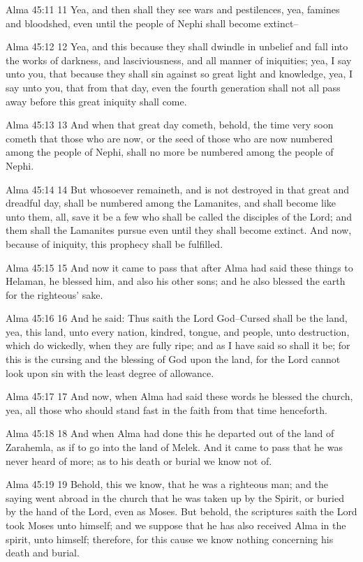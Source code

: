 Alma 45:11
 11 Yea, and then shall they see wars and pestilences, yea,
famines and bloodshed, even until the people of Nephi shall
become extinct--

Alma 45:12
 12 Yea, and this because they shall dwindle in unbelief and fall
into the works of darkness, and lasciviousness, and all manner of
iniquities; yea, I say unto you, that because they shall sin
against so great light and knowledge, yea, I say unto you, that
from that day, even the fourth generation shall not all pass away
before this great iniquity shall come.

Alma 45:13
 13 And when that great day cometh, behold, the time very soon
cometh that those who are now, or the seed of those who are now
numbered among the people of Nephi, shall no more be numbered
among the people of Nephi.

Alma 45:14
 14 But whosoever remaineth, and is not destroyed in that great
and dreadful day, shall be numbered among the Lamanites, and
shall become like unto them, all, save it be a few who shall be
called the disciples of the Lord; and them shall the Lamanites
pursue even until they shall become extinct. And now, because of
iniquity, this prophecy shall be fulfilled.

Alma 45:15
 15 And now it came to pass that after Alma had said these things
to Helaman, he blessed him, and also his other sons; and he also
blessed the earth for the righteous' sake.

Alma 45:16
 16 And he said: Thus saith the Lord God--Cursed shall be the
land, yea, this land, unto every nation, kindred, tongue, and
people, unto destruction, which do wickedly, when they are fully
ripe; and as I have said so shall it be; for this is the cursing
and the blessing of God upon the land, for the Lord cannot look
upon sin with the least degree of allowance.

Alma 45:17
 17 And now, when Alma had said these words he blessed the
church, yea, all those who should stand fast in the faith from
that time henceforth.

Alma 45:18
 18 And when Alma had done this he departed out of the land of
Zarahemla, as if to go into the land of Melek. And it came to
pass that he was never heard of more; as to his death or burial
we know not of.

Alma 45:19
 19 Behold, this we know, that he was a righteous man; and the
saying went abroad in the church that he was taken up by the
Spirit, or buried by the hand of the Lord, even as Moses. But
behold, the scriptures saith the Lord took Moses unto himself;
and we suppose that he has also received Alma in the spirit, unto
himself; therefore, for this cause we know nothing concerning his
death and burial.


